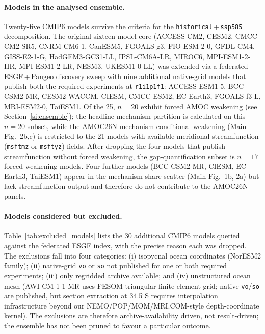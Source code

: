 \documentclass[10pt,a4paper]{article}
\begin{document}
\paragraph{Models in the analysed ensemble.}
Twenty-five CMIP6 models survive the criteria for the
\texttt{historical}\,+\,\texttt{ssp585} decomposition. The original
sixteen-model core (ACCESS-CM2, CESM2, CMCC-CM2-SR5, CNRM-CM6-1,
CanESM5, FGOALS-g3, FIO-ESM-2-0, GFDL-CM4, GISS-E2-1-G,
HadGEM3-GC31-LL, IPSL-CM6A-LR, MIROC6, MPI-ESM1-2-HR, MPI-ESM1-2-LR,
NESM3, UKESM1-0-LL) was extended via a federated-ESGF\,+\,Pangeo
discovery sweep with nine additional native-grid models that publish
both the required experiments at \texttt{r1i1p1f1}: ACCESS-ESM1-5,
BCC-CSM2-MR, CESM2-WACCM, CIESM, CMCC-ESM2, EC-Earth3, FGOALS-f3-L,
MRI-ESM2-0, TaiESM1. Of the 25, $n=20$ exhibit forced AMOC weakening
(see Section~\ref{si:ensemble}); the headline mechanism partition is
calculated on this $n=20$ subset, while the AMOC26N mechanism-conditional
weakening (Main Fig.~2b,c) is restricted to the 21 models with
available meridional-streamfunction (\texttt{msftmz} or
\texttt{msftyz}) fields. After dropping the four models that publish
streamfunction without forced weakening, the gap-quantification
subset is $n=17$ forced-weakening models. Four further models
(BCC-CSM2-MR, CIESM, EC-Earth3, TaiESM1) appear in the
mechanism-share scatter (Main Fig.~1b, 2a) but lack streamfunction
output and therefore do not contribute to the AMOC26N panels.

\paragraph{Models considered but excluded.}
Table~\ref{tab:excluded_models} lists the 30 additional CMIP6 models
queried against the federated ESGF index, with the precise reason each
was dropped. The exclusions fall into four categories: (i) isopycnal
ocean coordinates (NorESM2 family); (ii) native-grid \texttt{vo} or
\texttt{so} not published for one or both required experiments;
(iii) only regridded archive available; and (iv) unstructured ocean
mesh (AWI-CM-1-1-MR uses FESOM triangular finite-element grid; native
\texttt{vo}/\texttt{so} are published, but section extraction at
34.5$^\circ$S requires interpolation infrastructure beyond our
NEMO/POP/MOM/MRI.COM-style depth-coordinate kernel). The exclusions
are therefore archive-availability driven, not result-driven; the
ensemble has not been pruned to favour a particular outcome.
\end{document}
